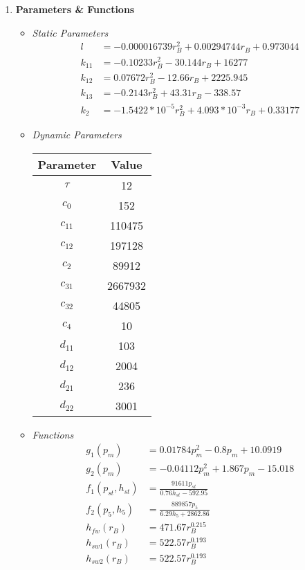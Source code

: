\documentclass[11pt, a4paper, fleqn]{article}
\begin{document}
\begin{enumerate}
\newpage
\item \textbf{Parameters \& Functions}
\begin{itemize}
	\item \textit{Static Parameters}
	\begin{align*}
		l &= -0.000016739 r_B^2 + 0.00294744 r_B + 0.973044\\
		k_{11} &= -0.10233 r_B^2 - 30.144 r_B + 16277 \\
		k_{12} &=  0.07672 r_B^2 - 12.66 r_B + 2225.945 \\
		k_{13} &= -0.2143 r_B^2 + 43.31 r_B - 338.57\\
		k_{2}  &= -1.5422*10^{-5}r_B^2 + 4.093*10^{-3}r_B + 0.33177
 	\end{align*}
 	\item \textit{Dynamic Parameters}
 	\begin{table}[h]
 		\centering
 		\begin{tabular}{c|c}
 			Parameter & Value \\ \hline
 			$\tau$ & 12 \\
 			$c_0$ & 152 \\
 			$c_{11}$ & 110475 \\
 			$c_{12}$ & 197128 \\
 			$c_{2}$ & 89912 \\
 			$c_{31}$ & 2667932 \\
 			$c_{32}$ & 44805 \\
 			$c_4$ & 10 \\
 			$d_{11}$ & 103 \\
 			$d_{12}$ & 2004 \\		
 			$d_{21}$ & 236 \\
 			$d_{22}$ & 3001			
  		\end{tabular}
 	\end{table}
 	\item \textit{Functions}
 	\begin{align*}
 		g_1(p_m) &=  0.01784p_m^2 - 0.8p_m + 10.0919 \\
 		g_2(p_m) &= -0.04112p_m^2 + 1.867p_m - 15.018 \\
 		f_1(p_{st},h_{st}) &= \frac{91611p_{st}}{0.76h_{st}-592.95}\\
 		f_2(p_5,h_5) &= \frac{889857p_5}{6.29h_5 + 2862.86} \\
 		h_{fw}(r_B) &= 471.67r_B^{0.215}\\
 		h_{sw1}(r_B) &= 522.57r_B^{0.193}\\
 		h_{sw2}(r_B) &= 522.57r_B^{0.193}\\

\end{align*}
\end{itemize}
\end{enumerate}
\end{document}
